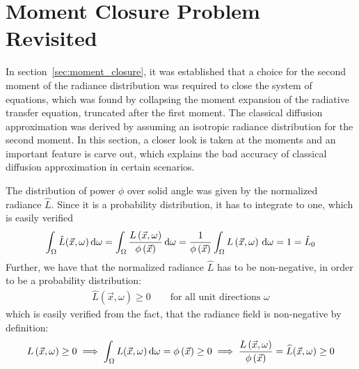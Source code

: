 \section{Moment Closure Problem Revisited}
\label{sec:moment_problem_revisited}

In section~\ref{sec:moment_closure}, it was established that a choice for the second moment of the radiance distribution was required to close the system of equations, which was found by collapsing the moment expansion of the radiative transfer equation, truncated after the first moment. The classical diffusion approximation was derived by assuming an isotropic radiance distribution for the second moment. In this section, a closer look is taken at the moments and an important feature is carve out, which explains the bad accuracy of classical diffusion approximation in certain scenarios.

The distribution of power $\phi$ over solid angle was given by the normalized radiance $\widehat{L}$. Since it is a probability distribution, it has to integrate to one, which is easily verified
\begin{align*}
\int_{\Omega}{\hat{L}(\vec{x}, \omega)\,\mathrm{d}\omega}=
\int_{\Omega}{\frac{L\left(\vec{x}, \omega\right)}{\phi\left(\vec{x}\right)}\,\mathrm{d}\omega}=
\frac{1}{\phi\left(\vec{x}\right)}
\int_{\Omega}{L\left(\vec{x}, \omega\right)\,\mathrm{d}\omega}
=1
=\hat{L}_0
\end{align*}
Further, we have that the normalized radiance $\widehat{L}$ has to be non-negative, in order to be a probability distribution:
\begin{align*}
\hat{L}(\vec{x}, \omega)\ge 0 \qquad \text{for all unit directions } \omega
\end{align*}
which is easily verified from the fact, that the radiance field is non-negative by definition:
\begin{align*}
L\left(\vec{x}, \omega\right) \ge 0
\implies
\int_{\Omega}{L(\vec{x}, \omega)\,\mathrm{d}\omega}=\phi\left(\vec{x}\right)\ge 0
\implies
\frac{L\left(\vec{x}, \omega\right)}{\phi\left(\vec{x}\right)}=\widehat{L}(\vec{x}, \omega) \ge 0
\end{align*}

